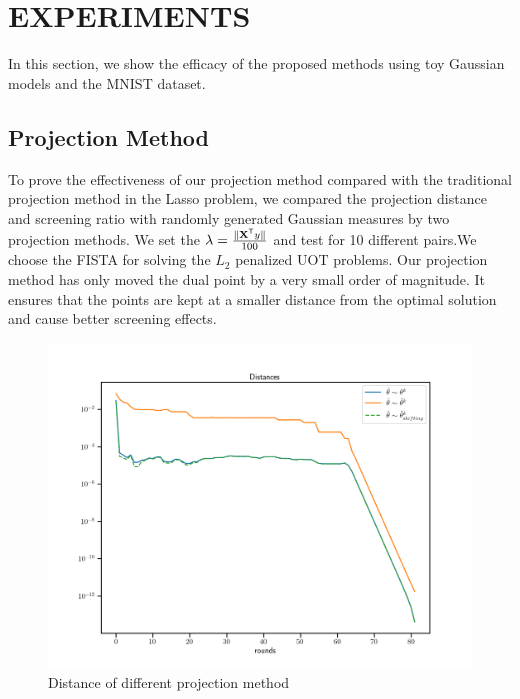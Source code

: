 \section{EXPERIMENTS}
In this section, we show the efficacy of the proposed methods using toy Gaussian models and the MNIST dataset.
\subsection{Projection Method}
To prove the effectiveness of our projection method compared with the traditional projection method in the Lasso problem, we compared the projection distance and screening ratio with randomly generated Gaussian measures by two projection methods. We set the $\lambda = \frac{\|\mathbf{X}^{\mathsf T}y\|}{100}$ and test for 10 different pairs.We choose the FISTA for solving the $L_2$ penalized UOT problems. Our projection method has only moved the dual point by a very small order of magnitude. It ensures that the points are kept at a smaller distance from the optimal solution and cause better screening effects.
	\begin{figure}[h]
	\begin{center}	
	\includegraphics[width = \linewidth]{pic/projdis}
	\caption{Distance of different projection method}
	\end{center}	
	\end{figure}
